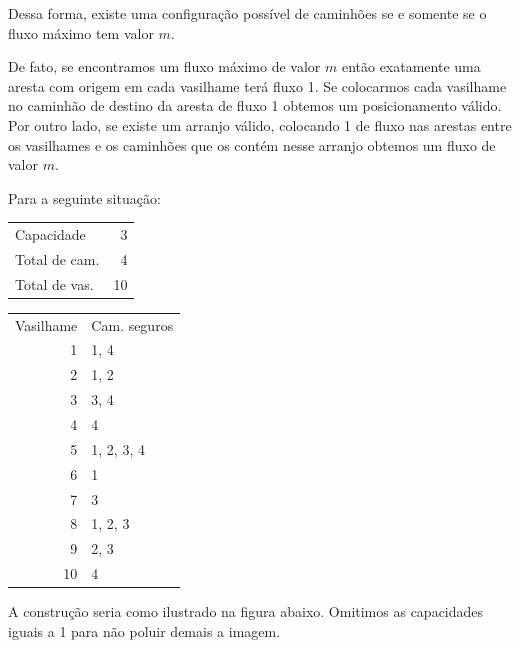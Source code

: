 \documentclass[11pt]{article}
\begin{document}
Dessa forma, existe uma configuração possível de caminhões se e
somente se o fluxo máximo tem valor $m$.

De fato, se encontramos um fluxo máximo de valor $m$ então exatamente
uma aresta com origem em cada vasilhame terá fluxo 1. Se colocarmos
cada vasilhame no caminhão de destino da aresta de fluxo 1 obtemos um
posicionamento válido. Por outro lado, se existe um arranjo válido,
colocando 1 de fluxo nas arestas entre os vasilhames e os caminhões
que os contém nesse arranjo obtemos um fluxo de valor $m$.

Para a seguinte situação:
\begin{center}
\begin{tabular}{lr}
Capacidade & 3\\
Total de cam. & 4\\
Total de vas. & 10\\
\end{tabular}
\end{center}


\begin{center}
\begin{tabular}{r l}
Vasilhame & Cam. seguros\\
1 & 1, 4\\
2 & 1, 2\\
3 & 3, 4\\
4 & 4\\
5 & 1, 2, 3, 4\\
6 & 1\\
7 & 3\\
8 & 1, 2, 3\\
9 & 2, 3\\
10 & 4\\
\end{tabular}
\end{center}



A construção seria como ilustrado na figura abaixo. Omitimos as
capacidades iguais a 1 para não poluir demais a imagem.
\end{document}

